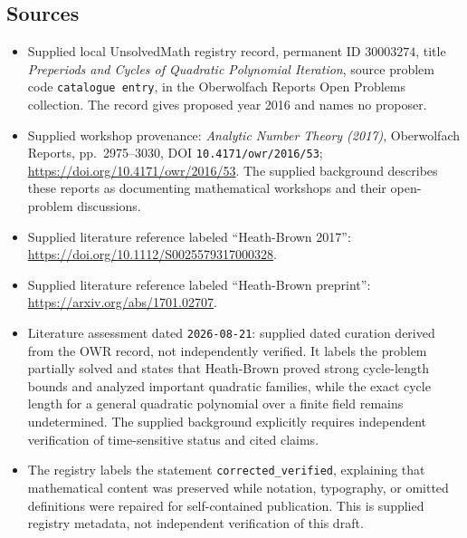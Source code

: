 \documentclass[11pt]{article}
\begin{document}
\subsection{Sources}
\begin{itemize}
\item Supplied local UnsolvedMath registry record, permanent ID \(30003274\), title \emph{Preperiods and Cycles of Quadratic Polynomial Iteration}, source problem code \texttt{catalogue entry}, in the Oberwolfach Reports Open Problems collection. The record gives proposed year 2016 and names no proposer.
\item Supplied workshop provenance: \emph{Analytic Number Theory (2017)}, Oberwolfach Reports, pp.\ 2975--3030, DOI \texttt{10.4171/owr/2016/53}; \url{https://doi.org/10.4171/owr/2016/53}. The supplied background describes these reports as documenting mathematical workshops and their open-problem discussions.
\item Supplied literature reference labeled ``Heath-Brown 2017'': \url{https://doi.org/10.1112/S0025579317000328}.
\item Supplied literature reference labeled ``Heath-Brown preprint'': \url{https://arxiv.org/abs/1701.02707}.
\item Literature assessment dated \texttt{2026-08-21}: supplied dated curation derived from the OWR record, not independently verified. It labels the problem partially solved and states that Heath-Brown proved strong cycle-length bounds and analyzed important quadratic families, while the exact cycle length for a general quadratic polynomial over a finite field remains undetermined. The supplied background explicitly requires independent verification of time-sensitive status and cited claims.
\item The registry labels the statement \texttt{corrected\_verified}, explaining that mathematical content was preserved while notation, typography, or omitted definitions were repaired for self-contained publication. This is supplied registry metadata, not independent verification of this draft.
\end{itemize}
\end{document}
